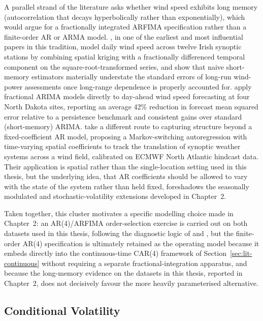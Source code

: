 \documentclass[11pt, a4paper, twoside]{article}
\begin{document}
A parallel strand of the literature asks whether wind speed exhibits long memory (autocorrelation that decays hyperbolically rather than exponentially), which would argue for a fractionally integrated ARFIMA specification rather than a finite-order AR or ARMA model. \citet{HaslettRaftery1989}, in one of the earliest and most influential papers in this tradition, model daily wind speed across twelve Irish synoptic stations by combining spatial kriging with a fractionally differenced temporal component on the square-root-transformed series, and show that naive short-memory estimators materially understate the standard errors of long-run wind-power assessments once long-range dependence is properly accounted for. \citet{KavasseriSeetharaman2009} apply fractional ARIMA models directly to day-ahead wind speed forecasting at four North Dakota sites, reporting an average 42\% reduction in forecast mean squared error relative to a persistence benchmark and consistent gains over standard (short-memory) ARIMA. \citet{AilliotEtAl2006} take a different route to capturing structure beyond a fixed-coefficient AR model, proposing a Markov-switching autoregression with time-varying spatial coefficients to track the translation of synoptic weather systems across a wind field, calibrated on ECMWF North Atlantic hindcast data. Their application is spatial rather than the single-location setting used in this thesis, but the underlying idea, that AR coefficients should be allowed to vary with the state of the system rather than held fixed, foreshadows the seasonally modulated and stochastic-volatility extensions developed in Chapter~2.

Taken together, this cluster motivates a specific modelling choice made in Chapter~2: an AR(4)/ARFIMA order-selection exercise is carried out on both datasets used in this thesis, following the diagnostic logic of \citet{HaslettRaftery1989} and \citet{KavasseriSeetharaman2009}, but the finite-order AR(4) specification is ultimately retained as the operating model because it embeds directly into the continuous-time CAR(4) framework of Section~\ref{sec:lit-continuous} without requiring a separate fractional-integration apparatus, and because the long-memory evidence on the datasets in this thesis, reported in Chapter~2, does not decisively favour the more heavily parameterised alternative.

\subsection{Conditional Volatility}
\label{sec:lit-volatility}
\end{document}
